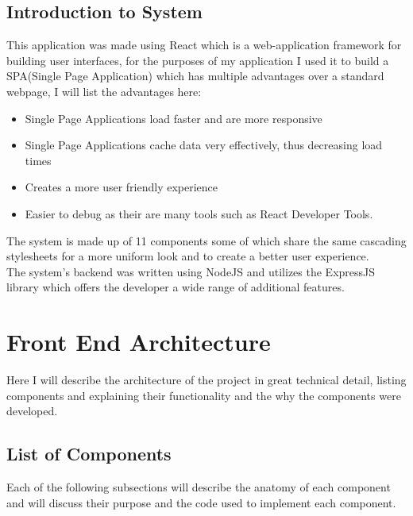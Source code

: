 \subsection{Introduction to System}
This application was made using React which is a web-application framework for building user interfaces,
for the purposes of my application I used it to build a SPA(Single Page Application) which has multiple
advantages over a standard webpage, I will list the advantages here:
\begin{itemize}
  \item Single Page Applications load faster and are more responsive
  \item Single Page Applications cache data very effectively, thus decreasing load times
  \item Creates a more user friendly experience
  \item Easier to debug as their are many tools such as React Developer Tools.
\end{itemize}
The system is made up of 11 components some of which share the same cascading stylesheets for
a more uniform look and to create a better user experience.
\\
The system's backend was written using NodeJS and utilizes the ExpressJS library
which offers the developer a wide range of additional features.
\section{Front End Architecture}
Here I will describe the architecture of the project in great technical detail, listing components and explaining their functionality and the why the components were developed.
\subsection{List of Components}
Each of the following subsections will describe the anatomy of each component and will discuss their purpose and the code used to implement each component.
